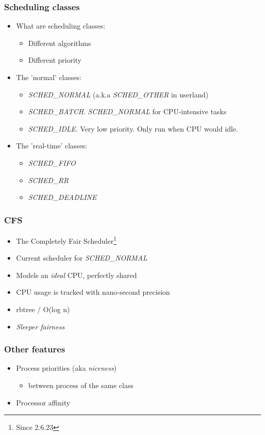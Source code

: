 \begin{frame}
  \frametitle{Scheduling classes}

  \begin{itemize}
  \item What are scheduling classes:
    \begin{itemize}
    \item Different algorithms
    \item Different priority
    \end{itemize}
  \item The 'normal' classes:
    \begin{itemize}
    \item \emph{SCHED\_NORMAL} (a.k.a \emph{SCHED\_OTHER} in userland)
    \item \emph{SCHED\_BATCH}. \emph{SCHED\_NORMAL} for CPU-intensive tasks
    \item \emph{SCHED\_IDLE}. Very low priority. Only run when CPU would idle.
    \end{itemize}
  \item The 'real-time' classes:
    \begin{itemize}
    \item \emph{SCHED\_FIFO}
    \item \emph{SCHED\_RR}
    \item \emph{SCHED\_DEADLINE}
    \end{itemize}
  \end{itemize}
\end{frame}


\begin{frame}
  \frametitle{CFS}

  \begin{itemize}
  \item The Completely Fair Scheduler\footnote{Since 2.6.23}
  \item Current scheduler for \emph{SCHED\_NORMAL}
  \item Models an \emph{ideal} CPU, perfectly shared
  \item CPU usage is tracked with nano-second precision
  \item rbtree / O(log n)
  \item \emph{Sleeper fairness}
  \end{itemize}
\end{frame}

\begin{frame}
  \frametitle{Other features}

  \begin{itemize}
  \item Process priorities (aka \emph{niceness})
    \begin{itemize}
    \item between process of the same class
    \end{itemize}
  \item Processor affinity
  \end{itemize}
\end{frame}



